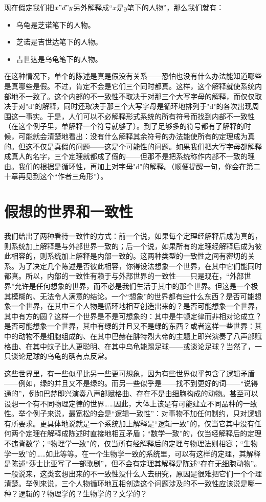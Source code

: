 现在假定我们把$x"d"y$另外解释成“$x$是$y$笔下的人物”，那么我们就有：
\begin{itemize}
\item 乌龟是芝诺笔下的人物。
\item 芝诺是吉世达笔下的人物。
\item 吉世达是乌龟笔下的人物。
\end{itemize}
在这种情况下，单个的陈述是真是假没有关系——恐怕也没有什么办法能知道哪些是真哪些是假。不过，肯定不会是它们三个同时都真。这样，这个解释就使系统内部地不一致了。这个内部的不一致性不取决于对那三个大写字母的解释，而仅仅取决于对"d"的解释，同时还取决于那三个大写字母是循环地排列于"d"的各次出现周围这一事实。于是，人们可以不必解释形式系统的所有符号而找到内部不一致性（在这个例子里，单解释一个符号就够了）。到了足够多的符号都有了解释的时候，可能就会清楚地看出：没有什么解释其余符号的办法能使所有的定理成为真的。但这不仅是真假的问题——这是个可能性的问题。如果我们把大写字母都解释成真人的名字，三个定理就都成了假的——但那不是把系统称作内部不一致的理由。我们的根据是循环性，再加上对字母"d"的解释。（顺便提醒一句，你会在第二十章再见到这个“作者三角形”）。

\section{假想的世界和一致性}

我们给出了两种看待一致性的方式：前一个说，如果每个定理经解释后成为真的，则系统加上解释是与外部世界一致的；后一个说，如果所有的定理经解释后成为彼此相容的，则系统加上解释是内部一致的。这两种类型的一致性之间有密切的关系。为了决定几个陈述是否彼此相容，你得设法想象一个世界，在其中它们能同时都真。所以，内部的一致性有赖于与外部世界的一致性——只是现在，“外部世界”允许是任何想象的世界，而不必是我们生活于其中的那个世界。但这是一个极其模糊的、无法令人满意的结论。一个“想象”的世界都有些什么东西？是否可能想象一个世界，在其中三个人物是循环地相互创造出来的？是否可能想象一个世界，其中有方的圆？这样一个世界是不是可想象的：其中是牛顿定律而非相对论成立？是否可能想象一个世界，其中有绿的并且又不是绿的东西？或者这样一些世界：其中的动物不是细胞组成的、在其中巴赫在腓特烈大帝的主题上即兴演奏了八声部赋格曲、在其中蚊子比人更聪明、在其中乌龟能踢足球——或谈论足球？当然了，一只谈论足球的乌龟的确有点反常。

这些世界里，有一些似乎比另一些更可想象，因为有些世界似乎包含了逻辑矛盾——例如，绿的并且又不是绿的。而另一些似乎是——找不到更好的词——“说得通的”，例如巴赫即兴演奏八声部赋格曲、存在不是由细胞构成的动物。甚至可以设想一个有不同物理定律的世界……因此，大体上该是有可能建立不同品种的一致性。举个例子来说，最宽松的会是“逻辑一致性”：对事物不加任何制约，只对逻辑有所要求。更具体地说就是一个系统加上解释是“逻辑一致”的，仅当它其中没有任何两个定理在解释成陈述时直接地相互矛盾；“数学一致”的，仅当经解释后的定理不违背数学；“物理学一致”的，仅当所有经解释后的定理与物理法则相容；“生物学一致”的……如此等等。在一个生物学一致的系统里，可以有这样的定理，其解释是陈述“莎士比亚写了一部歌剧”，但不会有定理其解释是陈述“存在无细胞动物”。一般说来，这类玄想出来的不一致性没什么人去研究，原因是很难把它们一个个理清楚。举例来说，三个人物循环地互相创造这个问题涉及的不一致性应该说是哪一种？逻辑的？物理学的？生物学的？文学的？

